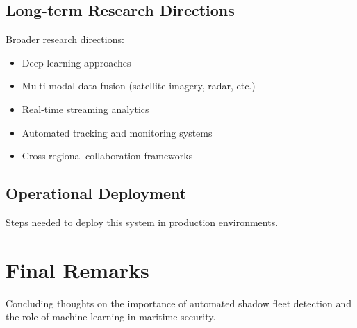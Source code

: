 \subsection{Long-term Research Directions}
Broader research directions:
\begin{itemize}
    \item Deep learning approaches
    \item Multi-modal data fusion (satellite imagery, radar, etc.)
    \item Real-time streaming analytics
    \item Automated tracking and monitoring systems
    \item Cross-regional collaboration frameworks
\end{itemize}

\subsection{Operational Deployment}
Steps needed to deploy this system in production environments.

\section{Final Remarks}
Concluding thoughts on the importance of automated shadow fleet detection and the role of machine learning in maritime security.

